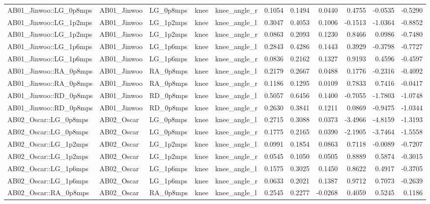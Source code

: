 \begin{table}
\begin{tabular}{lllllrrrrrr}
AB01_Jinwoo::LG_0p8mps & AB01_Jinwoo & LG_0p8mps & knee & knee_angle_r & 0.1054 & 0.1494 & 0.0440 & 0.4755 & -0.0535 & -0.5290 \\
AB01_Jinwoo::LG_1p2mps & AB01_Jinwoo & LG_1p2mps & knee & knee_angle_l & 0.3047 & 0.4053 & 0.1006 & -0.1513 & -1.0364 & -0.8852 \\
AB01_Jinwoo::LG_1p2mps & AB01_Jinwoo & LG_1p2mps & knee & knee_angle_r & 0.0863 & 0.2093 & 0.1230 & 0.8466 & 0.0986 & -0.7480 \\
AB01_Jinwoo::LG_1p6mps & AB01_Jinwoo & LG_1p6mps & knee & knee_angle_l & 0.2843 & 0.4286 & 0.1443 & 0.3929 & -0.3798 & -0.7727 \\
AB01_Jinwoo::LG_1p6mps & AB01_Jinwoo & LG_1p6mps & knee & knee_angle_r & 0.0836 & 0.2162 & 0.1327 & 0.9193 & 0.4596 & -0.4597 \\
AB01_Jinwoo::RA_0p8mps & AB01_Jinwoo & RA_0p8mps & knee & knee_angle_l & 0.2179 & 0.2667 & 0.0488 & 0.1776 & -0.2316 & -0.4092 \\
AB01_Jinwoo::RA_0p8mps & AB01_Jinwoo & RA_0p8mps & knee & knee_angle_r & 0.1186 & 0.1295 & 0.0109 & 0.7833 & 0.7416 & -0.0417 \\
AB01_Jinwoo::RD_0p8mps & AB01_Jinwoo & RD_0p8mps & knee & knee_angle_l & 0.5057 & 0.6456 & 0.1400 & -0.7055 & -1.7803 & -1.0748 \\
AB01_Jinwoo::RD_0p8mps & AB01_Jinwoo & RD_0p8mps & knee & knee_angle_r & 0.2630 & 0.3841 & 0.1211 & 0.0869 & -0.9475 & -1.0344 \\
AB02_Oscar::LG_0p8mps & AB02_Oscar & LG_0p8mps & knee & knee_angle_l & 0.2715 & 0.3088 & 0.0373 & -3.4966 & -4.8159 & -1.3193 \\
AB02_Oscar::LG_0p8mps & AB02_Oscar & LG_0p8mps & knee & knee_angle_r & 0.1775 & 0.2165 & 0.0390 & -2.1905 & -3.7464 & -1.5558 \\
AB02_Oscar::LG_1p2mps & AB02_Oscar & LG_1p2mps & knee & knee_angle_l & 0.0991 & 0.1854 & 0.0863 & 0.7118 & -0.0089 & -0.7207 \\
AB02_Oscar::LG_1p2mps & AB02_Oscar & LG_1p2mps & knee & knee_angle_r & 0.0545 & 0.1050 & 0.0505 & 0.8889 & 0.5874 & -0.3015 \\
AB02_Oscar::LG_1p6mps & AB02_Oscar & LG_1p6mps & knee & knee_angle_l & 0.1575 & 0.3025 & 0.1450 & 0.8622 & 0.4917 & -0.3705 \\
AB02_Oscar::LG_1p6mps & AB02_Oscar & LG_1p6mps & knee & knee_angle_r & 0.0633 & 0.2021 & 0.1387 & 0.9712 & 0.7073 & -0.2639 \\
AB02_Oscar::RA_0p8mps & AB02_Oscar & RA_0p8mps & knee & knee_angle_l & 0.2545 & 0.2277 & -0.0268 & 0.4059 & 0.5245 & 0.1186 \\

\end{tabular}
\end{table}
